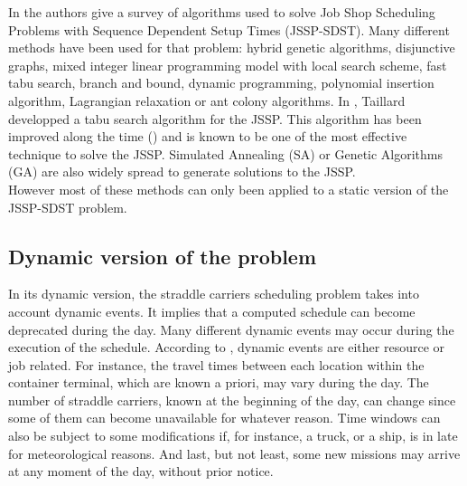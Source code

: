 \documentclass[review]{elsarticle}
\begin{document}
In \cite{Allahverdi2008} the authors give a survey of algorithms used to solve Job Shop Scheduling Problems with Sequence Dependent Setup Times (JSSP-SDST). Many different methods have been used for that problem: hybrid genetic algorithms, disjunctive graphs, mixed integer linear programming model with local search scheme, fast tabu search, branch and bound, dynamic programming, polynomial insertion algorithm, Lagrangian relaxation or ant colony algorithms. In \cite{Taillard1994}, Taillard developped a tabu search algorithm for the JSSP. This algorithm has been improved along the time (\cite{Blazewicz1996, Watson2003}) and is known to be one of the most effective technique to solve the JSSP. Simulated Annealing (SA) or Genetic Algorithms (GA) are also widely spread to generate solutions to the JSSP.\\%

However most of these methods can only been applied to a static version of the JSSP-SDST problem.

\subsection{Dynamic version of the problem}\label{subsec:dynamic}

In its dynamic version, the straddle carriers scheduling problem takes into account dynamic events. It implies that a computed schedule can become deprecated during the day. Many different dynamic events may occur during the execution of the schedule. According to \cite{Ouelhadj2009}, dynamic events are either resource or job related. For instance, the travel times between each location within the container terminal, which are known a priori, may vary during the day. The number of straddle carriers, known at the beginning of the day, can change since some of them can become unavailable for whatever reason. Time windows can also be subject to some modifications if, for instance, a truck, or a ship, is in late for meteorological reasons. And last, but not least, some new missions may arrive at any moment of the day, without prior notice.\\
\end{document}
